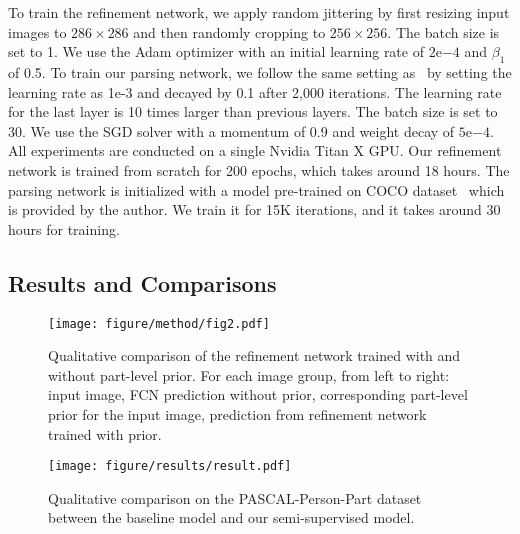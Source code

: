 \documentclass[10pt,twocolumn,letterpaper]{article}
\newcommand{\expnumber}[2]{{#1}\mathrm{e}{#2}}
\begin{document}
To train the refinement network, we apply random jittering by first resizing input images to $286 \times 286$ and then randomly cropping to $256 \times 256$. The batch size is set to 1. We use the Adam optimizer with an initial learning rate of $\expnumber{2}{-4}$ and $\beta_1$ of 0.5. To train our parsing network, we follow the same setting as~\cite{chen2016attention} by setting the learning rate as 1e-3 and decayed by 0.1 after 2,000 iterations. The learning rate for the last layer is 10 times larger than previous layers. The batch size is set to 30. We use the SGD solver with a momentum of 0.9 and weight decay of $\expnumber{5}{-4}$. All experiments are conducted on a single Nvidia Titan X GPU. Our refinement network is trained from scratch for 200 epochs, which takes around 18 hours. The parsing network is initialized with a model pre-trained on COCO dataset~\cite{lin2014microsoft} which is provided by the author. We train it for 15K iterations, and it takes around 30 hours for training.

\subsection{Results and Comparisons}
\begin{figure}[t!]
\begin{center}
\texttt{[image: figure/method/fig2.pdf]}
\end{center}
\vspace{-3mm}
   \caption{Qualitative comparison of the refinement network trained with and without part-level prior. For each image group, from left to right: input image, FCN prediction without prior, corresponding part-level prior for the input image, prediction from refinement network trained with prior.}
\label{fig:prior}
\vspace{-2mm}
\end{figure}

\begin{figure*}[t!]
\begin{center}
\texttt{[image: figure/results/result.pdf]}
\end{center}
\vspace{-3mm}
   \caption{Qualitative comparison on the PASCAL-Person-Part dataset between the baseline model and our semi-supervised model.}
\label{fig:res}
\vspace{-3mm}
\end{figure*}
\end{document}
